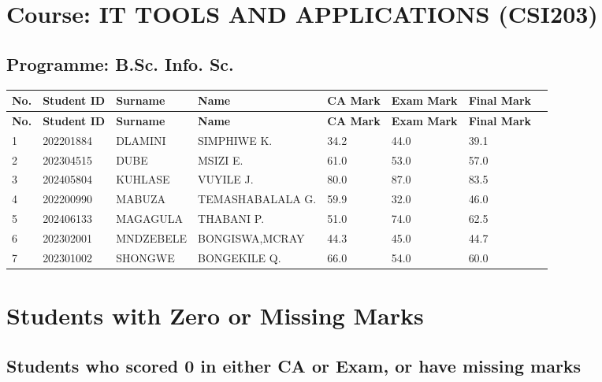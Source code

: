 \documentclass[12pt]{article}
\begin{document}
\clearpage

\section*{Course: IT TOOLS AND APPLICATIONS (CSI203)}
\subsection*{Programme: B.Sc. Info. Sc.}

\begin{longtable}{@{}llllllll@{}}
\toprule
\textbf{No.} & \textbf{Student ID} & \textbf{Surname} & \textbf{Name} & \textbf{CA Mark} & \textbf{Exam Mark} & \textbf{Final Mark} \\
\midrule
\endfirsthead

\toprule
\textbf{No.} & \textbf{Student ID} & \textbf{Surname} & \textbf{Name} & \textbf{CA Mark} & \textbf{Exam Mark} & \textbf{Final Mark} \\
\midrule
\endhead

\bottomrule
\endfoot

1 & 202201884 & DLAMINI & SIMPHIWE K. & 34.2 & 44.0 & 39.1 \\
2 & 202304515 & DUBE & MSIZI E. & 61.0 & 53.0 & 57.0 \\
3 & 202405804 & KUHLASE & VUYILE J. & 80.0 & 87.0 & 83.5 \\
4 & 202200990 & MABUZA & TEMASHABALALA G. & 59.9 & 32.0 & 46.0 \\
5 & 202406133 & MAGAGULA & THABANI P. & 51.0 & 74.0 & 62.5 \\
6 & 202302001 & MNDZEBELE & BONGISWA,MCRAY & 44.3 & 45.0 & 44.7 \\
7 & 202301002 & SHONGWE & BONGEKILE Q. & 66.0 & 54.0 & 60.0 \\

\end{longtable}

\clearpage

\section*{Students with Zero or Missing Marks}
\subsection*{Students who scored 0 in either CA or Exam, or have missing marks}
\end{document}
